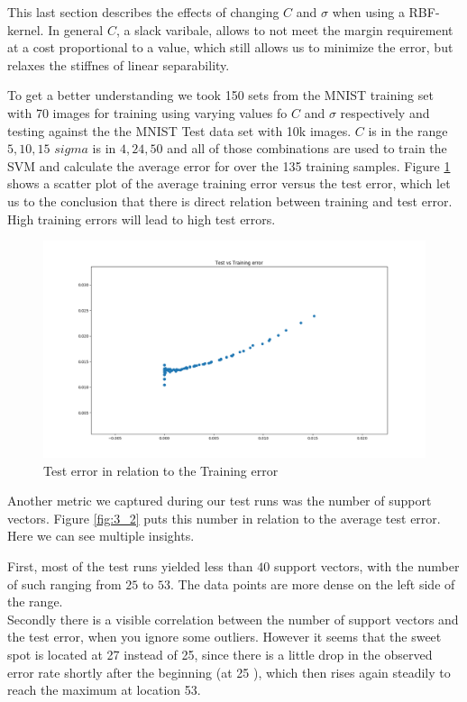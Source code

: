This last section describes the effects of changing $C$ and $\sigma$ when using a RBF-kernel. In general $C$, a slack varibale, allows to not meet the margin requirement at a cost proportional to a value, which still allows us to minimize the error, but relaxes the stiffnes of linear separability.


To get a better understanding we took 150 sets from the MNIST training set with 70 images for training using varying values fo $C$ and $\sigma$ respectively and testing against the the MNIST Test data set with 10k images. $C$ is in the range ${5, 10, 15}$ $sigma$ is in ${4, 24, 50}$ and all of those combinations are used to train the SVM and calculate the average error for over the 135 training samples. 
Figure \ref{fig:3_1} shows a scatter plot of the average training error versus the  test error, which let us to the conclusion that there is direct  relation between training and test error. High training errors will lead to high test errors.\\

\begin{figure}[!h]
\begin{center}
\centering
\includegraphics[width=1\textwidth]{figures/new/3_Figure_1}
\end{center}
\caption{\label{fig:3_1}  Test error in relation to the Training error  }
\end{figure}


Another metric we captured during our test runs was the number of support vectors. Figure \ref{fig:3_2} puts this number in relation to the average test error.  Here we can see multiple insights. 

First, most of the test runs yielded less than $40$ support vectors, with the number of such ranging from $25$ to $53$. The data points are more dense on the left side of the range.\\
Secondly there is a visible correlation between the number of support vectors and the test error, when you ignore some outliers. However it seems that the sweet spot is located at 27 instead of 25, since there is a little drop in the observed error rate shortly after the beginning (at 25 ), which then rises again steadily to reach the maximum at location 53.


